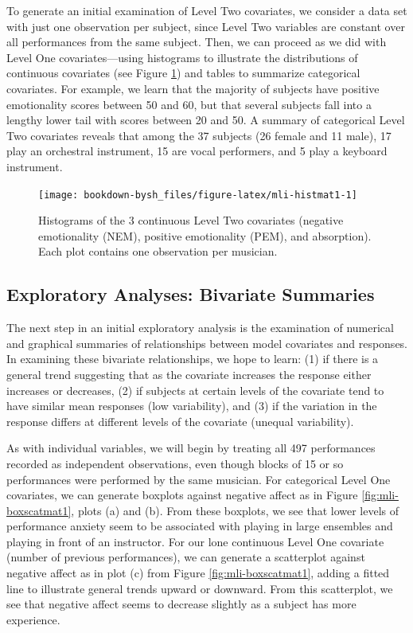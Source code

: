 \documentclass[
]{krantz}
\begin{document}
To generate an initial examination of Level Two covariates, we consider a data set with just one observation per subject, since Level Two variables are constant over all performances from the same subject. Then, we can proceed as we did with Level One covariates---using histograms to illustrate the distributions of continuous covariates (see Figure \ref{fig:mli-histmat1}) and tables to summarize categorical covariates. For example, we learn that the majority of subjects have positive emotionality scores between 50 and 60, but that several subjects fall into a lengthy lower tail with scores between 20 and 50. A summary of categorical Level Two covariates reveals that among the 37 subjects (26 female and 11 male), 17 play an orchestral instrument, 15 are vocal performers, and 5 play a keyboard instrument.

\begin{figure}

{\centering \texttt{[image: bookdown-bysh\_files/figure-latex/mli-histmat1-1]} 

}

\caption{Histograms of the 3 continuous Level Two covariates (negative emotionality (NEM), positive emotionality (PEM), and absorption).  Each plot contains one observation per musician.}\label{fig:mli-histmat1}
\end{figure}

\hypertarget{explore2}{%
\subsection{Exploratory Analyses: Bivariate Summaries}\label{explore2}}

The next step in an initial exploratory analysis is the examination of numerical and graphical summaries of relationships between model covariates and responses. In examining these bivariate relationships, we hope to learn: (1) if there is a general trend suggesting that as the covariate increases the response either increases or decreases, (2) if subjects at certain levels of the covariate tend to have similar mean responses (low variability), and (3) if the variation in the response differs at different levels of the covariate (unequal variability).

As with individual variables, we will begin by treating all 497 performances recorded as independent observations, even though blocks of 15 or so performances were performed by the same musician. For categorical Level One covariates, we can generate boxplots against negative affect as in Figure \ref{fig:mli-boxscatmat1}, plots (a) and (b). From these boxplots, we see that lower levels of performance anxiety seem to be associated with playing in large ensembles and playing in front of an instructor. For our lone continuous Level One covariate (number of previous performances), we can generate a scatterplot against negative affect as in plot (c) from Figure \ref{fig:mli-boxscatmat1}, adding a fitted line to illustrate general trends upward or downward. From this scatterplot, we see that negative affect seems to decrease slightly as a subject has more experience.
\end{document}
